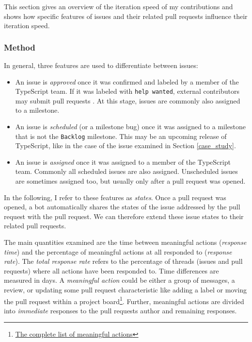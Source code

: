 \documentclass[12pt]{scrartcl}
\def\code#1{\texttt{\frenchspacing#1}}
\begin{document}
This section gives an overview of the iteration speed of my contributions and shows how specific features of issues and their related pull requests influence their iteration speed.

\subsubsection{Method}

In general, three features are used to differentiate between issues:

\begin{itemize}
    \item An issue is \textit{approved} once it was confirmed and labeled by a member of the TypeScript team. If it was labeled with \code{help wanted}, external contributors may submit pull requests \cite{ContributingGuidelines}. At this stage, issues are commonly also assigned to a milestone.
    \item An issue is \textit{scheduled} (or a milestone bug) once it was assigned to a milestone that is not the \code{Backlog} milestone. This may be an upcoming release of TypeScript, like in the case of the issue examined in Section \ref{case_study}.
    \item An issue is \textit{assigned} once it was assigned to a member of the TypeScript team. Commonly all scheduled issues are also assigned. Unscheduled issues are sometimes assigned too, but usually only after a pull request was opened.
\end{itemize}

In the following, I refer to these features as \textit{states}. Once a pull request was opened, a bot automatically shares the states of the issue addressed by the pull request with the pull request. We can therefore extend these issue states to their related pull requests.

The main quantities examined are the time between meaningful actions (\textit{response time}) and the percentage of meaningful actions at all responded to (\textit{response rate}). The \textit{total response rate} refers to the percentage of threads (issues and pull requests) where all actions have been responded to. Time differences are measured in days. A \textit{meaningful action} could be either a group of messages, a review, or updating some pull request characteristic like adding a label or moving the pull request within a project board\footnote{\href{https://github.com/jonhue/osp/tree/sources/analysis}{The complete list of meaningful actions}}. Further, meaningful actions are divided into \textit{immediate} responses to the pull requests author and remaining responses.
\end{document}
